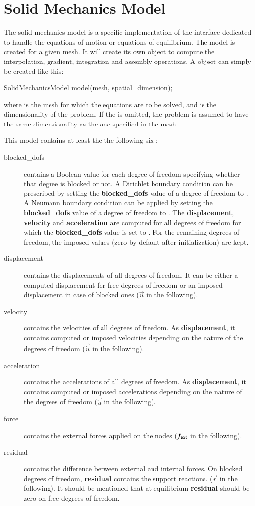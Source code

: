 \chapter{Solid Mechanics Model\label{sect:smm}}

The solid mechanics model is a specific implementation of the
 interface dedicated to handle the equations of motion or
equations of equilibrium. The model is created for a given mesh.  It
will create its own  object to compute the interpolation,
gradient, integration and assembly operations.  A
 object can simply be created like this:
\begin{cpp}
  SolidMechanicsModel model(mesh, spatial_dimension);
\end{cpp}
where  is the mesh for which the equations are to be
solved, and  is the dimensionality of the
problem.  If the  is omitted, the problem is
assumed to have the same dimensionality as the one specified in the
mesh.

This model contains at least the the following six :
\begin{description}
\item[blocked\_dofs] contains a Boolean value for each degree of
  freedom specifying whether that degree is blocked or not. A
  Dirichlet boundary condition can be prescribed by setting the
  \textbf{blocked\_dofs} value of a degree of freedom to .
  A Neumann boundary condition can be applied by setting the
  \textbf{blocked\_dofs} value of a degree of freedom to .
  The \textbf{displacement}, \textbf{velocity} and
  \textbf{acceleration} are computed for all degrees of freedom for
  which the \textbf{blocked\_dofs} value is set to . For
  the remaining degrees of freedom, the imposed values (zero by
  default after initialization) are kept.
\item[displacement] contains the displacements of all degrees of
  freedom. It can be either a computed displacement for free degrees
  of freedom or an imposed displacement in case of blocked ones
  ($\vec{u}$ in the following).
\item[velocity] contains the velocities of all degrees of freedom.  As
  \textbf{displacement}, it contains computed or imposed velocities
  depending on the nature of the degrees of freedom ($\vec{\dot{u}}$
  in the following).
\item[acceleration] contains the accelerations of all degrees of
  freedom. As \textbf{displacement}, it contains computed or imposed
  accelerations depending on the nature of the degrees of freedom
  ($\vec{\ddot{u}}$ in the following).
\item[force] contains the external forces applied on the nodes
  ($\boldsymbol{f_{{\mathrm{ext}}}}$ in the following).
\item[residual] contains the difference between external and internal
  forces. On blocked degrees of freedom, \textbf{residual} contains
  the support reactions.  ($\vec{r}$ in the following).  It should be
  mentioned that at equilibrium \textbf{residual} should be zero on
  free degrees of freedom.
\end{description}

